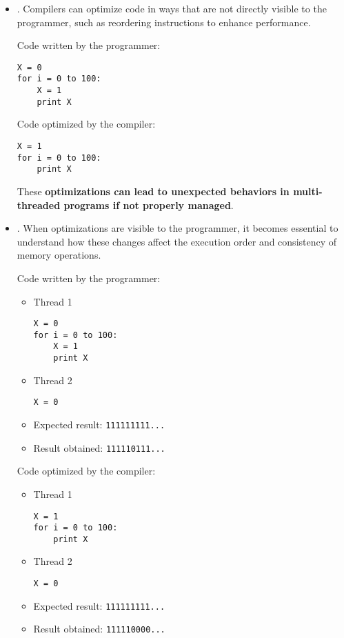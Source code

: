 \begin{itemize}
    \item {}. Compilers can optimize code in ways that are not directly visible to the programmer, such as reordering instructions to enhance performance.
    \begin{examplebox}
        Code written by the programmer:
        \begin{lstlisting}
X = 0
for i = 0 to 100:
    X = 1
    print X\end{lstlisting}
        Code optimized by the compiler:
        \begin{lstlisting}
X = 1
for i = 0 to 100:
    print X\end{lstlisting}
    \end{examplebox}
    These \textbf{optimizations can lead to unexpected behaviors in multi-threaded programs if not properly managed}.
    
    \item {}. When optimizations are visible to the programmer, it becomes essential to understand how these changes affect the execution order and consistency of memory operations.
    \begin{examplebox}
        Code written by the programmer:
        \begin{itemize}
            \item Thread 1
            \begin{lstlisting}
X = 0
for i = 0 to 100:
    X = 1
    print X\end{lstlisting}
            \item Thread 2
            \begin{lstlisting}
X = 0\end{lstlisting}
            \item Expected result: \texttt{111111111...}
            \item Result obtained: \texttt{111110111...}
        \end{itemize}
        Code optimized by the compiler:
        \begin{itemize}
            \item Thread 1
            \begin{lstlisting}
X = 1
for i = 0 to 100:
    print X\end{lstlisting}
            \item Thread 2
            \begin{lstlisting}
X = 0\end{lstlisting}
            \item Expected result: \texttt{111111111...}
            \item Result obtained: \texttt{111110000...}
        \end{itemize}
    \end{examplebox}
\end{itemize}

